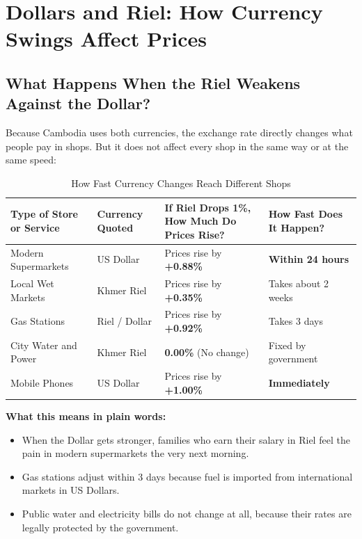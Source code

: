 \documentclass[11pt,a4paper,oneside]{article}
\begin{document}
\newpage

\section{Dollars and Riel: How Currency Swings Affect Prices}

\subsection{What Happens When the Riel Weakens Against the Dollar?}
Because Cambodia uses both currencies, the exchange rate directly changes what people pay in shops. But it does not affect every shop in the same way or at the same speed:

\begin{table}[h]
\centering
\small
\caption{How Fast Currency Changes Reach Different Shops}
\begin{tabular}{p{4.0cm}p{2.5cm}p{4.5cm}p{3.0cm}}
\toprule
\textbf{Type of Store or Service} & \textbf{Currency Quoted} & \textbf{If Riel Drops 1\%, How Much Do Prices Rise?} & \textbf{How Fast Does It Happen?} \\
\midrule
Modern Supermarkets & US Dollar & Prices rise by \textbf{+0.88\%} & \textbf{Within 24 hours} \\
Local Wet Markets & Khmer Riel & Prices rise by \textbf{+0.35\%} & Takes about 2 weeks \\
Gas Stations & Riel / Dollar & Prices rise by \textbf{+0.92\%} & Takes 3 days \\
City Water and Power & Khmer Riel & \textbf{0.00\%} (No change) & Fixed by government \\
Mobile Phones & US Dollar & Prices rise by \textbf{+1.00\%} & \textbf{Immediately} \\
\bottomrule
\end{tabular}
\end{table}

\textbf{What this means in plain words:}
\begin{itemize}
    \item When the Dollar gets stronger, families who earn their salary in Riel feel the pain in modern supermarkets the very next morning.
    \item Gas stations adjust within 3 days because fuel is imported from international markets in US Dollars.
    \item Public water and electricity bills do not change at all, because their rates are legally protected by the government.
\end{itemize}
\end{document}
